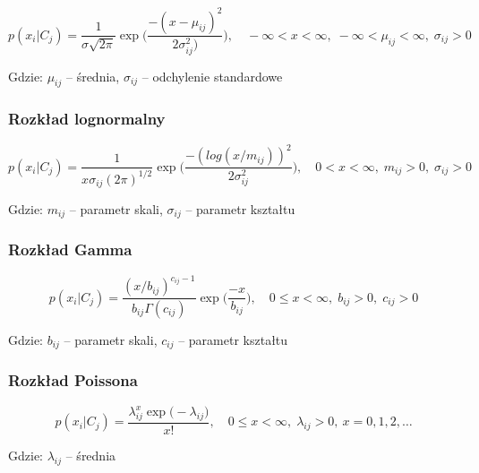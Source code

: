 	\begin{equation}
	\label{eq_gauss}
	p(x_i | C_j) = \frac{1}{\sigma \sqrt{2 \pi}}\exp\bigg(\frac{-(x-\mu_{ij})^2}{2\sigma_{ij}^2)}\bigg), \quad
	-\infty < x < \infty, \; -\infty < \mu_{ij} < \infty, \; \sigma_{ij}  > 0
	\end{equation}

\noindent Gdzie: $\mu_{ij}$ -- średnia, $\sigma_{ij}$ -- odchylenie standardowe

\subsubsection{Rozkład lognormalny}
\label{subsec_lognorm}

	\begin{equation}
	\label{eq_lognorm}
	p(x_i | C_j) = \frac{1}{x \sigma_{ij} (2 \pi)^{1/2}} \exp\bigg( \frac{-(log(x/m_{ij}))^2}{2 \sigma_{ij}^2} \bigg), \quad
	0 < x < \infty, \; m_{ij} > 0, \; \sigma_{ij}  > 0
	\end{equation}

\noindent Gdzie: $m_{ij}$ -- parametr skali, $\sigma_{ij}$ -- parametr kształtu

\subsubsection{Rozkład Gamma}
\label{subsec_gamma}

	\begin{equation}
	\label{eq_gamma}
	p(x_i | C_j) = \frac{(x/b_{ij})^{c_{ij}-1}}{b_{ij} \Gamma(c_{ij})} \exp \bigg( \frac{-x}{b_{ij}} \bigg), \quad
	0 \leq x < \infty, \; b_{ij} > 0, \; c_{ij}  > 0
	\end{equation}

\noindent Gdzie: $b_{ij}$ -- parametr skali, $c_{ij}$ -- parametr kształtu
	
\subsubsection{Rozkład Poissona}
\label{subsec_gamma}

	\begin{equation}
	\label{eq_poisson}
	p(x_i | C_j) = \frac{\lambda_{ij}^x \exp \big( -\lambda_{ij} \big)}{x!}, \quad
	0 \leq x < \infty, \; \lambda_{ij} > 0, \: x=0,1,2, \dots
	\end{equation}

\noindent Gdzie: $\lambda_{ij}$ -- średnia